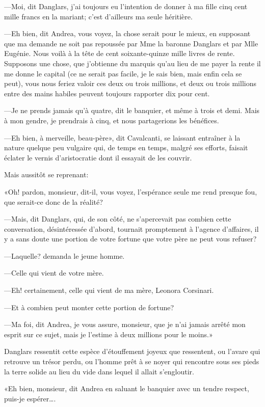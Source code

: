 —Moi, dit Danglars, j'ai toujours eu l'intention de donner à ma fille cinq cent mille francs en la mariant; c'est d'ailleurs ma seule héritière. 

—Eh bien, dit Andrea, vous voyez, la chose serait pour le mieux, en supposant que ma demande ne soit pas repoussée par Mme la baronne Danglars et par Mlle Eugénie. Nous voilà à la tête de cent soixante-quinze mille livres de rente. Supposons une chose, que j'obtienne du marquis qu'au lieu de me payer la rente il me donne le capital (ce ne serait pas facile, je le sais bien, mais enfin cela se peut), vous nous feriez valoir ces deux ou trois millions, et deux ou trois millions entre des mains habiles peuvent toujours rapporter dix pour cent. 

—Je ne prends jamais qu'à quatre, dit le banquier, et même à trois et demi. Mais à mon gendre, je prendrais à cinq, et nous partagerions les bénéfices. 

—Eh bien, à merveille, beau-père», dit Cavalcanti, se laissant entraîner à la nature quelque peu vulgaire qui, de temps en temps, malgré ses efforts, faisait éclater le vernis d'aristocratie dont il essayait de les couvrir. 

Mais aussitôt se reprenant: 

«Oh! pardon, monsieur, dit-il, vous voyez, l'espérance seule me rend presque fou, que serait-ce donc de la réalité? 

—Mais, dit Danglars, qui, de son côté, ne s'apercevait pas combien cette conversation, désintéressée d'abord, tournait promptement à l'agence d'affaires, il y a sans doute une portion de votre fortune que votre père ne peut vous refuser? 

—Laquelle? demanda le jeune homme. 

—Celle qui vient de votre mère. 

—Eh! certainement, celle qui vient de ma mère, Leonora Corsinari. 

—Et à combien peut monter cette portion de fortune? 

—Ma foi, dit Andrea, je vous assure, monsieur, que je n'ai jamais arrêté mon esprit sur ce sujet, mais je l'estime à deux millions pour le moins.» 

Danglars ressentit cette espèce d'étouffement joyeux que ressentent, ou l'avare qui retrouve un trésor perdu, ou l'homme prêt à se noyer qui rencontre sous ses pieds la terre solide au lieu du vide dans lequel il allait s'engloutir. 

«Eh bien, monsieur, dit Andrea en saluant le banquier avec un tendre respect, puis-je espérer\dots. 

